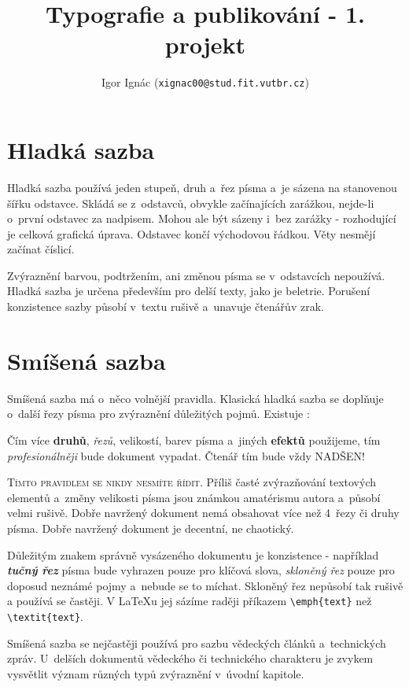 \documentclass[a4paper, twocolumn, 10pt]{article}
\title{Typografie a publikování - 1. projekt}
\author{Igor Ignác (\texttt{xignac00@stud.fit.vutbr.cz})}
\date{}
\begin{document}
\maketitle

\section{Hladká sazba}
\label{sec:smooth}

Hladká sazba používá jeden stupeň, druh a~řez písma a~je sázena na stanovenou šířku odstavce. Skládá se z~odstavců, obvykle začínajících zarážkou, nejde-li o~první odstavec za nadpisem. Mohou ale být sázeny i~bez zarážky - rozhodující je celková grafická úprava. Odstavec končí východovou řádkou. Věty nesmějí začínat číslicí.
\par
Zvýraznění barvou, podtržením, ani změnou písma se v~odstavcích nepoužívá. Hladká sazba je určena především pro delší texty, jako je beletrie. Porušení konzistence sazby působí v~textu rušivě a~unavuje čtenářův zrak.

\section{Smíšená sazba}
\label{sec:mixed}

Smíšená sazba má o~něco volnější pravidla. Klasická hladká sazba se doplňuje o~další řezy písma pro zvýraznění důležitých pojmů. Existuje :

\begin{displayquote}
Čím více \textbf{druhů}, \textit{řezů}, {\footnotesize velikostí}, barev písma a~jiných{ \tiny \textbf{efektů}} použijeme, tím \textsl{profesionálněji} bude dokument vypadat. Čtenář tím bude{ \LARGE vždy}{ \huge NADŠEN!}
\end{displayquote}

\textsc{Tímto pravidlem se nikdy nesmíte řídit.} Příliš časté zvýrazňování textových elementů a~změny velikosti písma jsou známkou amatérismu autora a~působí velmi rušivě. Dobře navržený dokument nemá obsahovat více než
4~řezy či druhy písma. Dobře navržený dokument je decentní, ne chaotický.
\par
Důležitým znakem správně vysázeného dokumentu je konzistence - například \textbf{\emph{tučný řez}} písma bude vyhrazen pouze pro klíčová slova, \textsl{skloněný řez} pouze pro doposud neznámé pojmy a~nebude se to míchat. Skloněný řez nepůsobí tak rušivě a používá se častěji. V \LaTeX u jej sázíme raději příkazem \verb|\emph{text}| než \verb|\textit{text}|.
\par
Smíšená sazba se nejčastěji používá pro sazbu vědeckých článků a~technických zpráv. U~delších dokumentů vědeckého či technického charakteru je zvykem vysvětlit význam různých typů zvýraznění v~úvodní kapitole.
\end{document}
